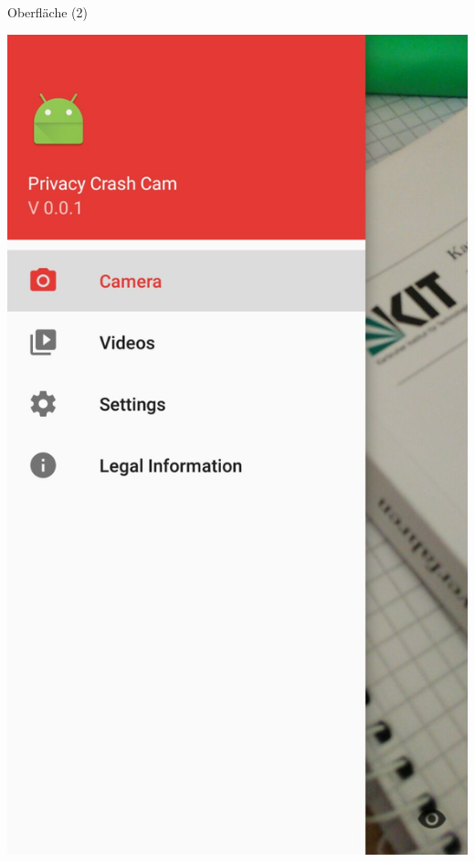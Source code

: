 \documentclass[19pt]{beamer}
\begin{document}
\begin{frame}{Oberfläche (2)}
\begin{center}
\includegraphics[scale=0.1]{resources/AppDemo2.jpg}
\end{center}
\end{frame}
\end{document}
